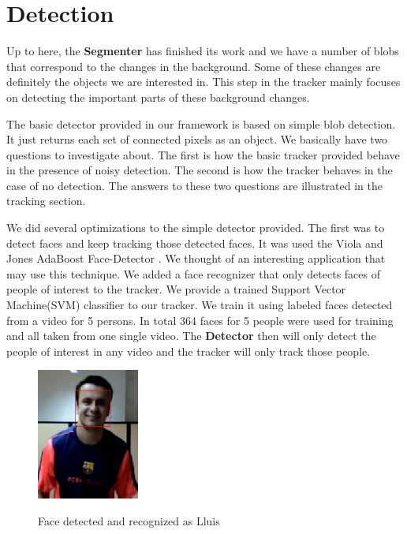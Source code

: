 \section{Detection}

Up to here, the \textbf{Segmenter} has finished its work and we have a number of blobs that correspond to the changes in the background. Some of these changes are definitely the objects we are interested in. This step in the tracker mainly focuses on detecting the important parts of these background changes.

The basic detector provided in our framework is based on simple blob detection. It just returns each set of connected pixels as an object. We basically have two questions to investigate about. The first is how the basic tracker provided behave in the presence of noisy detection. The second is how the tracker behaves in the case of no detection. The answers to these two questions are illustrated in the tracking section.

We did several optimizations to the simple detector provided. The first was to detect faces and keep tracking those detected faces. It was used the Viola and Jones AdaBoost Face-Detector \cite{fd}. We thought of an interesting application that may use this technique. We added a face recognizer that only detects faces of people of interest to the tracker. We provide a trained Support Vector Machine(SVM) classifier to our tracker. We train it using labeled faces detected from a video for 5 persons. In total 364 faces for 5 people were used for training and all taken from one single video. The \textbf{Detector} then will only detect the people of interest in any video and the tracker will only track those people.

\begin{figure}[Face detection and recognition]{\includegraphics[width=0.3\textwidth]{det_lluis}}
  \centering
  \caption{Face detected and recognized as Lluis}
\end{figure}


